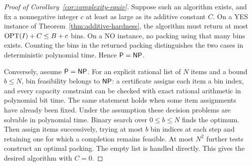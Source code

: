 \begin{proof}[Proof of Corollary~\ref{cor:complexity-equiv}]
Suppose such an algorithm exists, and fix a nonnegative integer $c$
at least as large as its additive constant $C$.
On a YES instance of Theorem~\ref{thm:additive-hardness}, the algorithm
must return at most $\operatorname{OPT}(I)+C\le B+c$ bins.
On a NO instance, no packing using that many bins exists.
Counting the bins in the returned packing distinguishes the two cases
in deterministic polynomial time.  Hence $\mathsf P=\mathsf{NP}$.

Conversely, assume $\mathsf P=\mathsf{NP}$.
For an explicit rational list of $N$ items and a bound $b\le N$,
bin feasibility belongs to $\mathsf{NP}$: a certificate assigns each item
a bin index, and every capacity constraint can be checked with exact
rational arithmetic in polynomial bit time.
The same statement holds when some item assignments have already been
fixed.  Under the assumption these decision problems are solvable in
polynomial time.  Binary search over $0\le b\le N$ finds the optimum.
Then assign items successively, trying at most $b$ bin indices at each
step and retaining one for which a completion remains feasible.
At most $N^2$ further tests construct an optimal packing.  The empty
list is handled directly.  This gives the desired algorithm with $C=0$.
\end{proof}
